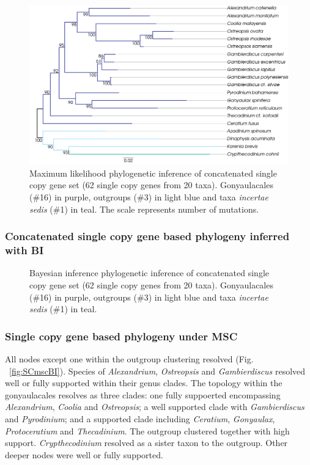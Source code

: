 \documentclass[12pt]{article}
\begin{document}
\begin{figure} 
\includegraphics[scale=.45]{figures/Singlecopy-concat-ML.png} 
\caption{Maximum likelihood phylogenetic inference of concatenated single copy gene set (62 single copy genes from 20 taxa). Gonyaulacales (\#16) in purple, outgroups (\#3) in light blue and taxa \textit{incertae sedis} (\#1) in teal. The scale represents number of mutations.} 
\label{fig:SCconcatML}
\end{figure} 
\FloatBarrier

\subsubsection*{Concatenated single copy gene based phylogeny inferred with BI}
\FloatBarrier 

\begin{figure} 
\caption{Bayesian inference phylogenetic inference of concatenated single copy gene set (62 single copy genes from 20 taxa). Gonyaulacales (\#16) in purple, outgroups (\#3) in light blue and taxa \textit{incertae sedis} (\#1) in teal.} 
\label{fig:SCconcatBI}
\end{figure} 
\FloatBarrier

\subsubsection*{Single copy gene based phylogeny under MSC}
\FloatBarrier 
All nodes except one within the outgroup clustering resolved (Fig. ~\ref{fig:SCmscBI}). 
Species of \emph{Alexandrium}, \emph{Ostreopsis} and \emph{Gambierdiscus} resolved well or fully supported within their genus clades. 
The topology within the gonyaulacales resolves as three clades: 
one fully suppoerted encompassing \emph{Alexandrium}, \emph{Coolia} and \emph{Ostreopsis}; 
a well supported clade with \emph{Gambierdiscus} and \emph{Pyrodinium}; 
and a supported clade including \emph{Ceratium}, \emph{Gonyaulax}, \emph{Protoceratium} and \emph{Thecadinium}. 
The outgroup clustered together with high support. 
\emph{Crypthecodinium} resolved as a sister taxon to the outgroup. 
Other deeper nodes were well or fully supported.
\end{document}
